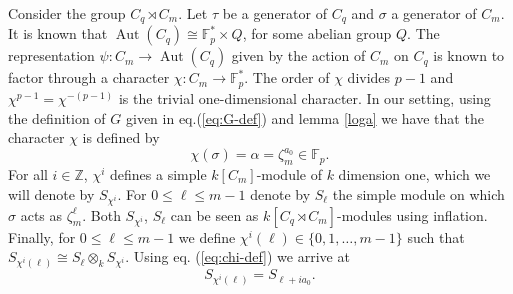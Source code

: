 \documentclass[11pt,letterpaper]{amsart}
\theoremstyle{definition}
\newtheorem{definition}[theorem]{Definition}
\DeclareMathOperator\Aut{Aut}
\newcommand{\Z}{\mathbb{Z}}
\begin{document}




 
Consider the group $C_q \rtimes C_m$. Let $\tau$ be a generator of $C_q$ and $\sigma$ a generator of $C_m$.  It is known that $\Aut(C_q)\cong \mathbb{F}_p^* \times Q$, for some abelian group $Q$. The representation $\psi:C_m \rightarrow \Aut(C_q)$ given by the action of $C_m$ on $C_q$ is known to factor through a character $\chi:C_m \rightarrow \mathbb{F}_p^*$. The order of $\chi$
divides $p-1$ and $\chi^{p-1}=\chi^{-(p-1)}$ is the trivial 
{one-dimensional
}
character. 
In our setting, using the definition of $G$ given in eq.\;(\ref{eq:G-def}) and lemma \ref{loga} we have that the character $\chi$ is defined by 
\begin{equation}
\label{eq:chi-def}
  \chi(\sigma)=\alpha=\zeta_m^{a_0} \in \mathbb{F}_p.
\end{equation}
For all $i\in \Z$, $\chi^i$ defines a simple $k[C_m]$-module of $k$ dimension one, which we will denote by $S_{\chi^i}$. For $0 \leq \ell \leq m-1$ denote by $S_\ell$ the simple module on which $\sigma$ acts as $\zeta_m^\ell$.  Both $S_{\chi^i}$, $S_\ell$ can be seen as $k[C_q\rtimes C_m]$-modules using inflation. Finally, for $0\leq \ell \leq m-1$ we define $\chi^i(\ell) \in \{0,1,\ldots,m-1\}$ such that $S_{\chi^i(\ell)} \cong S_\ell \otimes_k S_{\chi^i}$. Using eq. (\ref{eq:chi-def}) we arrive at 
\begin{equation}
\label{eq:chi-prod}
S_{\chi^i(\ell)}=S_{\ell+i a_0}.
\end{equation}
\end{document}
